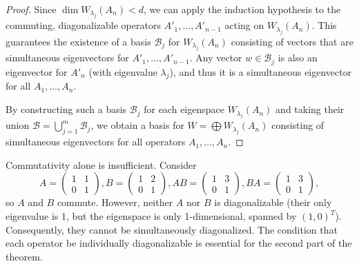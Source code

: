 \begin{proof}
Since $\dim W_{\lambda_j}(A_n) < d$, we can apply the induction hypothesis to the commuting, diagonalizable operators $A'_1, \dots, A'_{n-1}$ acting on $W_{\lambda_j}(A_n)$. This guarantees the existence of a basis $\mathcal{B}_j$ for $W_{\lambda_j}(A_n)$ consisting of vectors that are simultaneous eigenvectors for $A'_1, \dots, A'_{n-1}$. Any vector $w \in \mathcal{B}_j$ is also an eigenvector for $A'_n$ (with eigenvalue $\lambda_j$), and thus it is a simultaneous eigenvector for all $A_1, \dots, A_n$.

By constructing such a basis $\mathcal{B}_j$ for each eigenspace $W_{\lambda_j}(A_n)$ and taking their union $\mathcal{B} = \bigcup_{j=1}^m \mathcal{B}_j$, we obtain a basis for $W = \bigoplus W_{\lambda_j}(A_n)$ consisting of simultaneous eigenvectors for all operators $A_1, \dots, A_n$.
\end{proof}

\begin{remark}
Commutativity alone is insufficient. Consider 
\[A = \begin{pmatrix} 1 & 1 \\ 0 & 1 \end{pmatrix}, B = \begin{pmatrix} 1 & 2 \\ 0 & 1 \end{pmatrix}, AB = \begin{pmatrix} 1 & 3 \\ 0 & 1 \end{pmatrix}, BA = \begin{pmatrix} 1 & 3 \\ 0 & 1 \end{pmatrix},\] 
so $A$ and $B$ commute. However, neither $A$ nor $B$ is diagonalizable (their only eigenvalue is 1, but the eigenspace is only 1-dimensional, spanned by $(1, 0)^T$). Consequently, they cannot be simultaneously diagonalized. The condition that each operator be individually diagonalizable is essential for the second part of the theorem.
\end{remark}


